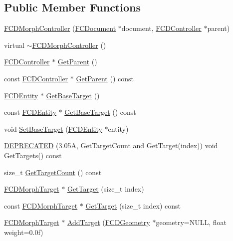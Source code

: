 \subsection*{Public Member Functions}
\begin{DoxyCompactItemize}
\item 
\hyperlink{classFCDMorphController_a7ca19cd7aa4ee0e8ddac751037aa9fb0}{FCDMorphController} (\hyperlink{classFCDocument}{FCDocument} $\ast$document, \hyperlink{classFCDController}{FCDController} $\ast$parent)
\item 
virtual \hyperlink{classFCDMorphController_a5e655cfc4e3e9419dc6fc6fd61c9b2e4}{$\sim$FCDMorphController} ()
\item 
\hyperlink{classFCDController}{FCDController} $\ast$ \hyperlink{classFCDMorphController_aa30efb4684a80d2c7226e3ad8819a24a}{GetParent} ()
\item 
const \hyperlink{classFCDController}{FCDController} $\ast$ \hyperlink{classFCDMorphController_a78fc1ba6858842513dc3a37ae553a786}{GetParent} () const 
\item 
\hyperlink{classFCDEntity}{FCDEntity} $\ast$ \hyperlink{classFCDMorphController_a7ccafd403cc1abeec2a0324b583fd452}{GetBaseTarget} ()
\item 
const \hyperlink{classFCDEntity}{FCDEntity} $\ast$ \hyperlink{classFCDMorphController_a485e835aae8d8764fd0b0deaf5ea8659}{GetBaseTarget} () const 
\item 
void \hyperlink{classFCDMorphController_a11196ee1bd50c02cbd82e75397816272}{SetBaseTarget} (\hyperlink{classFCDEntity}{FCDEntity} $\ast$entity)
\item 
\hyperlink{classFCDMorphController_a7ed532b78b17ff96e5cd1f888ecbf1b8}{DEPRECATED} (3.05A, GetTargetCount and GetTarget(index)) void GetTargets() const 
\item 
size\_\-t \hyperlink{classFCDMorphController_aec95e35c6454c09cfdd5bb76d5f79cc6}{GetTargetCount} () const 
\item 
\hyperlink{classFCDMorphTarget}{FCDMorphTarget} $\ast$ \hyperlink{classFCDMorphController_a8a6aeeb920cd60af2ae403cdb2bbfb36}{GetTarget} (size\_\-t index)
\item 
const \hyperlink{classFCDMorphTarget}{FCDMorphTarget} $\ast$ \hyperlink{classFCDMorphController_a2c08dbafbb92f3f22c660953249f7a76}{GetTarget} (size\_\-t index) const 
\item 
\hyperlink{classFCDMorphTarget}{FCDMorphTarget} $\ast$ \hyperlink{classFCDMorphController_a396c0633ba33ff55e8706fdf3a2e00d1}{AddTarget} (\hyperlink{classFCDGeometry}{FCDGeometry} $\ast$geometry=NULL, float weight=0.0f)

\end{DoxyCompactItemize}
